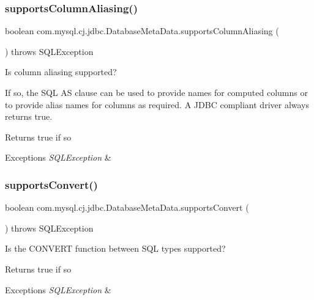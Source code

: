 \subsubsection{\texorpdfstring{supports\+Column\+Aliasing()}{supportsColumnAliasing()}}
{\footnotesize\ttfamily boolean com.\+mysql.\+cj.\+jdbc.\+Database\+Meta\+Data.\+supports\+Column\+Aliasing (\begin{DoxyParamCaption}{ }\end{DoxyParamCaption}) throws S\+Q\+L\+Exception}

Is column aliasing supported? 

If so, the S\+QL AS clause can be used to provide names for computed columns or to provide alias names for columns as required. A J\+D\+BC compliant driver always returns true. 

\begin{DoxyReturn}{Returns}
true if so 
\end{DoxyReturn}

\begin{DoxyExceptions}{Exceptions}
{\em S\+Q\+L\+Exception} & \\
\hline
\end{DoxyExceptions}
\mbox{\label{classcom_1_1mysql_1_1cj_1_1jdbc_1_1_database_meta_data_afabf2d6ef6b7cb8066fb868dee34deec}} 
\subsubsection{\texorpdfstring{supports\+Convert()}{supportsConvert()}}
{\footnotesize\ttfamily boolean com.\+mysql.\+cj.\+jdbc.\+Database\+Meta\+Data.\+supports\+Convert (\begin{DoxyParamCaption}{ }\end{DoxyParamCaption}) throws S\+Q\+L\+Exception}

Is the C\+O\+N\+V\+E\+RT function between S\+QL types supported?

\begin{DoxyReturn}{Returns}
true if so 
\end{DoxyReturn}

\begin{DoxyExceptions}{Exceptions}
{\em S\+Q\+L\+Exception} & \\
\hline
\end{DoxyExceptions}
\mbox{\label{classcom_1_1mysql_1_1cj_1_1jdbc_1_1_database_meta_data_aaa4b1901adca2c017f21dc0943909859}} 
